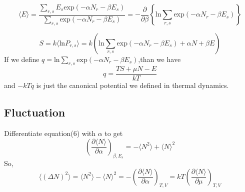 \documentclass{article}
\begin{document}
\begin{equation}
\langle E \rangle =\frac{\sum_{r,s} E_s \mathrm{exp}(-\alpha N_r-\beta E_s) }{\sum_{r,s} \mathrm{exp}(-\alpha N_r-\beta E_s)} = -\frac{\partial}{\partial \beta} \left\{ \mathrm{ln}\sum_{r,s} \mathrm{exp}(-\alpha N_r-\beta E_s) \right \}
\end{equation}

\begin{equation}
S= k\langle \mathrm{ln} P_{r,s} \rangle = k(\mathrm{ln} \sum_{r,s} \mathrm{exp}(-\alpha N_r-\beta E_s) +\alpha N +\beta E)
\end{equation}
If we define $q= \mathrm{ln} \sum_{r,s} \mathrm{exp}(-\alpha N_r-\beta E_s)$,than we have
\begin{equation}
q=\frac{TS+\mu N -E}{kT}
\end{equation}
and $-kTq$ is just the canonical potential we defined in thermal dynamics.

\subsection{Fluctuation}
Differentiate equation(6) with $\alpha$ to get
\begin{equation}
\left(\frac{\partial \langle N \rangle}{\partial \alpha}\right)_{\beta,E_s} = -\langle N^2 \rangle +\langle N \rangle ^2 
\end{equation}
So,
\begin{equation}
\langle (\Delta N)^2 \rangle = \langle N^2 \rangle - \langle N \rangle ^2 = - \left(\frac{\partial \langle N \rangle}{\partial \alpha}\right)_{T,V}=kT \left(\frac{\partial \langle N \rangle}{\partial \mu}\right)_{T,V}
\end{equation}
\end{document}
